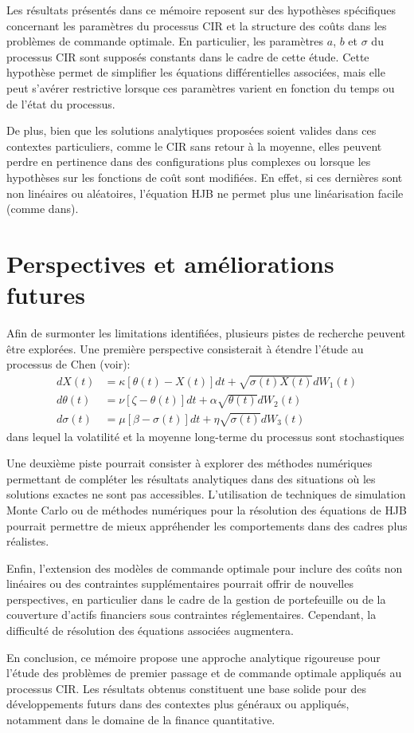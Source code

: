 Les résultats présentés dans ce mémoire reposent sur des hypothèses spécifiques concernant les paramètres du processus CIR et la structure des coûts dans les problèmes de commande optimale. En particulier, les paramètres \(a\), \(b\) et \(\sigma\) du processus \acs{CIR} sont supposés constants dans le cadre de cette étude. Cette hypothèse permet de simplifier les équations différentielles associées, mais elle peut s'avérer restrictive lorsque ces paramètres varient en fonction du temps ou de l'état du processus. 

De plus, bien que les solutions analytiques proposées soient valides dans ces contextes particuliers, comme le \acs{CIR} sans retour à la moyenne, elles peuvent perdre en pertinence dans des configurations plus complexes ou lorsque les hypothèses sur les fonctions de coût sont modifiées. En effet, si ces dernières sont non linéaires ou aléatoires, l'équation \acs{HJB} ne permet plus une linéarisation facile (comme dans\cite{whittle1982}).

\section{Perspectives et améliorations futures}

Afin de surmonter les limitations identifiées, plusieurs pistes de recherche peuvent être explorées. Une première perspective consisterait à étendre l'étude au processus de Chen (voir\cite{chen1996}):
\[
\begin{aligned}
    dX(t) &= \kappa[\theta(t)-X(t)]dt+\sqrt{\sigma(t)X(t)}dW_1(t) \\
    d\theta(t) &= \nu[\zeta-\theta(t)]dt+\alpha\sqrt{\theta(t)}dW_2(t) \\
    d\sigma(t) &= \mu[\beta-\sigma(t)]dt+\eta\sqrt{\sigma(t)}dW_3(t)
\end{aligned}
\]
dans lequel la volatilité et la moyenne long-terme du processus sont stochastiques

Une deuxième piste pourrait consister à explorer des méthodes numériques permettant de compléter les résultats analytiques dans des situations où les solutions exactes ne sont pas accessibles. L'utilisation de techniques de simulation Monte Carlo ou de méthodes numériques pour la résolution des équations de \acs{HJB} pourrait permettre de mieux appréhender les comportements dans des cadres plus réalistes.

Enfin, l'extension des modèles de commande optimale pour inclure des coûts non linéaires ou des contraintes supplémentaires pourrait offrir de nouvelles perspectives, en particulier dans le cadre de la gestion de portefeuille ou de la couverture d'actifs financiers sous contraintes réglementaires. Cependant, la difficulté de résolution des équations associées augmentera.

En conclusion, ce mémoire propose une approche analytique rigoureuse pour l'étude des problèmes de premier passage et de commande optimale appliqués au processus \acs{CIR}. Les résultats obtenus constituent une base solide pour des développements futurs dans des contextes plus généraux ou appliqués, notamment dans le domaine de la finance quantitative.